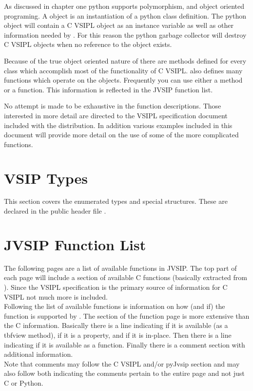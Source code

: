 As discussed in chapter one python supports polymorphism, and object oriented programing. A \pyjv{} object is an instantiation of a python class definition. The python object will contain a C VSIPL object as an instance variable as well as other information needed by \pyjv. For this reason the python garbage collector will destroy C VSIPL objects when no reference to the \pyjv{} object exists.

Because of the true object oriented nature of \pyjv{} there are methods defined for every class which accomplish most of the functionality of C VSIPL.  also defines many functions which operate on the \pyjv{} objects. Frequently you can use either a method or a function. This information is reflected in the JVSIP function list.

No attempt is made to be exhaustive in the function descriptions. Those interested in more detail are directed to the VSIPL specification document included with the \jv{} distribution. In addition various examples included in this document will provide more detail on the use of some of the more complicated functions.
%
%
\section*{VSIP Types}
This section covers the enumerated types and special structures. These are declared in the public header file .
%
\section*{JVSIP Function List}
The following pages are a list of available functions in JVSIP. The top part of each page will include a section of available C functions (basically extracted from ). Since the VSIPL specification is the primary source of information for C VSIPL not much more is included.\\
%
Following the list of available functions is information on how (and if) the function is supported by \pyjv. The \pyjv{} section of the function page is more extensive than the C information. Basically there is a line indicating if it is available (as a 	tbf{view} method), if it is a property, and if it is in-place. Then there is a line indicating if it is available as a \pyjv{} function. Finally there is a comment section with additional information.\\
%
Note that comments may follow the C VSIPL and/or pyJvsip section and may also follow both indicating the comments pertain to the entire page and not just C or Python.\\
%
